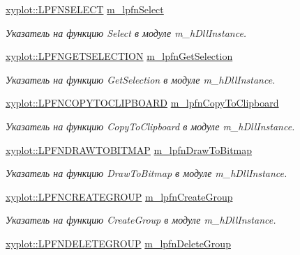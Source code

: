 \begin{DoxyCompactItemize}
\hyperlink{namespacexyplot_a8a0a6d08dd052f79805399d35f400536}{xyplot\-::\-L\-P\-F\-N\-S\-E\-L\-E\-C\-T} \hyperlink{group__gr_func_pointers_ga4be55c9f4df8ac61fd6735edfe546eb6}{m\-\_\-lpfn\-Select}
\begin{DoxyCompactList}\small\item\em Указатель на функцию Select в модуле m\-\_\-h\-Dll\-Instance. \end{DoxyCompactList}\item 
\hyperlink{namespacexyplot_accdc65e18386127090607d48d4d6ef55}{xyplot\-::\-L\-P\-F\-N\-G\-E\-T\-S\-E\-L\-E\-C\-T\-I\-O\-N} \hyperlink{group__gr_func_pointers_gab3365cbe41762a81c38364e87871cf33}{m\-\_\-lpfn\-Get\-Selection}
\begin{DoxyCompactList}\small\item\em Указатель на функцию Get\-Selection в модуле m\-\_\-h\-Dll\-Instance. \end{DoxyCompactList}\item 
\hyperlink{namespacexyplot_a64a77ea08258ed9ffc0bf7ffda3da7a4}{xyplot\-::\-L\-P\-F\-N\-C\-O\-P\-Y\-T\-O\-C\-L\-I\-P\-B\-O\-A\-R\-D} \hyperlink{group__gr_func_pointers_gaaa80069b8151f0ac44feb1d2c822cf37}{m\-\_\-lpfn\-Copy\-To\-Clipboard}
\begin{DoxyCompactList}\small\item\em Указатель на функцию Copy\-To\-Clipboard в модуле m\-\_\-h\-Dll\-Instance. \end{DoxyCompactList}\item 
\hyperlink{namespacexyplot_abe5bcbe4527096dba3cee83119449785}{xyplot\-::\-L\-P\-F\-N\-D\-R\-A\-W\-T\-O\-B\-I\-T\-M\-A\-P} \hyperlink{group__gr_func_pointers_gac78dbe52f4384dce76714ab7af98d53f}{m\-\_\-lpfn\-Draw\-To\-Bitmap}
\begin{DoxyCompactList}\small\item\em Указатель на функцию Draw\-To\-Bitmap в модуле m\-\_\-h\-Dll\-Instance. \end{DoxyCompactList}\item 
\hyperlink{namespacexyplot_ab1a3054ba818e5b40da27a562af9714c}{xyplot\-::\-L\-P\-F\-N\-C\-R\-E\-A\-T\-E\-G\-R\-O\-U\-P} \hyperlink{group__gr_func_pointers_gafe7e6b9cda98ce4ad3e328a195b21883}{m\-\_\-lpfn\-Create\-Group}
\begin{DoxyCompactList}\small\item\em Указатель на функцию Create\-Group в модуле m\-\_\-h\-Dll\-Instance. \end{DoxyCompactList}\item 
\hyperlink{namespacexyplot_a17ee39c2695e1c7c78048d0672744524}{xyplot\-::\-L\-P\-F\-N\-D\-E\-L\-E\-T\-E\-G\-R\-O\-U\-P} \hyperlink{group__gr_func_pointers_ga0503dbf4de0b55a29652e1266f5d6ef4}{m\-\_\-lpfn\-Delete\-Group}

\end{DoxyCompactItemize}
